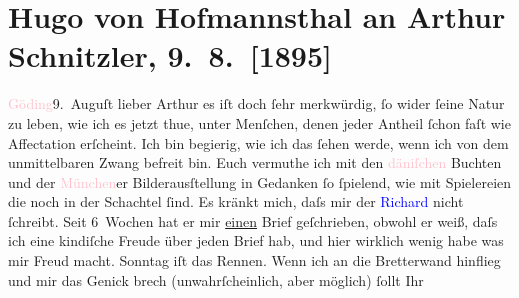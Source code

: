 

               \section[Hugo von Hofmannsthal an Arthur Schnitzler, 9. 8. {[}1895{]}]{ Hugo von Hofmannsthal an Arthur Schnitzler, 9. 8. {[}1895{]}}\nopagebreak{}\rehead{ }\normalsize\beginnumbering{} \toendnotes[C]{\smallbreak\pagebreak[2]} 
\pstart
           \raggedleft{}{\pb}\textcolor{pink}{Göding}{}\ledrightnote{\textcolor{pink}{Hodonín}}{ }9. Auguſt\pend
           \pstart{}lieber Arthur\pend\pstart
           es iſt doch ſehr merkwürdig, ſo wider ſeine Natur zu leben, wie ich es jetzt
                    thue, unter Menſchen, denen jeder Antheil ſchon faſt wie Affectation erſcheint.
                    Ich bin begierig, wie ich das ſehen werde, wenn ich von dem unmittelbaren Zwang
                    befreit bin. Euch vermuthe ich mit den \textcolor{pink}{däniſchen}{}\ledrightnote{\textcolor{pink}{Dänemark}} Buchten und der \textcolor{pink}{München}{}\ledrightnote{\textcolor{pink}{München}}er
                    Bilderausſtellung in {\pb}Gedanken ſo ſpielend, wie mit Spielereien die noch in der Schachtel ſind. Es
                    kränkt mich, daſs mir der \textcolor{blue}{Richard}{}\ledrightnote{\textcolor{blue}{Richard Beer-Hofmann}} nicht
                    ſchreibt. Seit 6 Wochen hat er mir \uline{einen} Brief
                    geſchrieben, obwohl er weiß, daſs ich eine kindiſche Freude über jeden Brief
                    hab, und hier wirklich wenig habe was mir Freud macht. Sonntag iſt das Rennen.
                    Wenn ich an die Bretterwand hinflieg und mir das Genick brech (unwahrſcheinlich,
                        {\pb}aber möglich) ſollt Ihr
